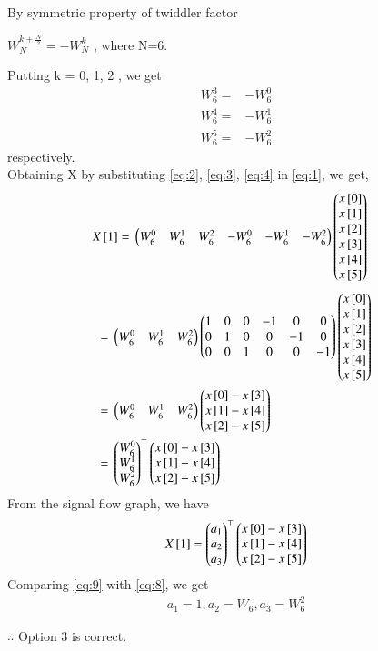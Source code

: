 \documentclass[journal,12pt,twocolumn]{IEEEtran}
\begin{document}
By symmetric property of twiddler factor 
\begin{center}
$W_{N}^{k+\frac{N}{2}} = -W_{N}^{k}$ , where N=6.
\end{center}
Putting k = 0, 1, 2 , we get 
\begin{align}
\label{eq:2}
W_{6}^{3}={}&-W_{6}^{0}\\
\label{eq:3}
W_{6}^{4}={}&-W_{6}^{1}\\
\label{eq:4}
W_{6}^{5}={}&-W_{6}^{2}
\end{align}
respectively.\\
Obtaining X by substituting \eqref{eq:2}, \eqref{eq:3}, \eqref{eq:4} in \eqref{eq:1}, we get,
\begin{align}
\label{eq:5}
X{}\left[1\right]={}&\begin{pmatrix}W_{6}^{0}&W_{6}^{1}&W_{6}^{2}&-W_{6}^{0}&-W_{6}^{1}&-W_{6}^{2}\end{pmatrix}\begin{pmatrix}x{}\left[0\right]\\x{}\left[1\right]\\x{}\left[2\right]\\x{}\left[3\right]\\x{}\left[4\right]\\x{}\left[5\right]\end{pmatrix}
\end{align}
\begin{align}
\label{eq:6}
={}&\begin{pmatrix}W_{6}^{0}&W_{6}^{1}&W_{6}^{2}\end{pmatrix}\begin{pmatrix}1 & 0 & 0 & -1 & 0 & 0\\0 & 1 & 0 & 0 & -1 & 0\\0 & 0 & 1 & 0 & 0 & -1\end{pmatrix}\begin{pmatrix}x{}\left[0\right]\\x{}\left[1\right]\\x{}\left[2\right]\\x{}\left[3\right]\\x{}\left[4\right]\\x{}\left[5\right]\end{pmatrix}\\
\label{eq:7}
={}&\begin{pmatrix}W_{6}^{0}&W_{6}^{1}&W_{6}^{2}\end{pmatrix}\begin{pmatrix}x{}\left[0\right]-x{}\left[3\right]\\ x{}\left[1\right]-x{}\left[4\right]\\ x{}\left[2\right]-x{}\left[5\right]\end{pmatrix}\\
\label{eq:8}
={}&\begin{pmatrix}W_{6}^{0}\\W_{6}^{1}\\W_{6}^{2}\end{pmatrix}^\top\begin{pmatrix}x{}\left[0\right]-x{}\left[3\right]\\ x{}\left[1\right]-x{}\left[4\right]\\ x{}\left[2\right]-x{}\left[5\right]\end{pmatrix}
\end{align}
From the signal flow graph, we have 
\begin{align}
\label{eq:9}
X{}\left[1\right]=\begin{pmatrix}a_{1} \\a_{2} \\ a_{3}\end{pmatrix}^\top\begin{pmatrix}x{}\left[0\right]-x{}\left[3\right]\\ x{}\left[1\right]-x{}\left[4\right]\\ x{}\left[2\right]-x{}\left[5\right]\end{pmatrix}
\end{align}
Comparing \eqref{eq:9} with \eqref{eq:8}, we get
\begin{align}
\label{eq:10} 
a_{1}=1, a_{2}=W_{6}, a_{3}=W_{6}^{2}
\end{align}

$\therefore$ Option 3 is correct.
\end{document}
